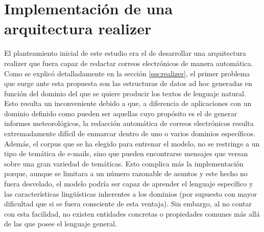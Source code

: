 \section{Implementación de una arquitectura realizer}\label{s:realizer}

El planteamiento inicial de este estudio era el de desarrollar una arquitectura realizer que fuera capaz de redactar correos electrónicos de manera automática. Como se explicó detalladamente en la sección \ref{sss:realizer}, el primer problema que surge ante esta propuesta son las estructuras de datos ad hoc generadas en función del dominio del que se quiere producir los textos de lenguaje natural. Esto resulta un inconveniente debido a que, a diferencia de aplicaciones con un dominio definido como pueden ser aquellas cuyo propósito es el de generar informes meteorológicos, la redacción automática de correos electrónicos resulta extremadamente difícil de enmarcar dentro de uno o varios dominios específicos. Además, el corpus que se ha elegido para entrenar el modelo, no se restringe a un tipo de temática de e-mails, sino que pueden encontrarse mensajes que versan sobre una gran variedad de temáticas. Esto complica más la implementación porque, aunque se limitara a un número razonable de asuntos y este hecho no fuera desvelado, el modelo podría ser capaz de aprender el lenguaje específico y las características lingüísticas inherentes a los dominios (por supuesto con mayor dificultad que si se fuera consciente de esta ventaja). Sin embargo, al no contar con esta facilidad, no existen entidades concretas o propiedades comunes más allá de las que posee el lenguaje general.

